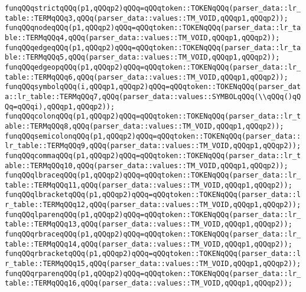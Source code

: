 \verb|funqQQqstrictqQQq(p1,qQQqp2)qQQq=qQQqtoken::TOKENqQQq(parser_data::lr_table::TERMqQQq3,qQQq(parser_data::values::TM_VOID,qQQqp1,qQQqp2));|\newline
\verb|funqQQqnodeqQQq(p1,qQQqp2)qQQq=qQQqtoken::TOKENqQQq(parser_data::lr_table::TERMqQQq4,qQQq(parser_data::values::TM_VOID,qQQqp1,qQQqp2));|\newline
\verb|funqQQqedgeqQQq(p1,qQQqp2)qQQq=qQQqtoken::TOKENqQQq(parser_data::lr_table::TERMqQQq5,qQQq(parser_data::values::TM_VOID,qQQqp1,qQQqp2));|\newline
\verb|funqQQqedgeopqQQq(p1,qQQqp2)qQQq=qQQqtoken::TOKENqQQq(parser_data::lr_table::TERMqQQq6,qQQq(parser_data::values::TM_VOID,qQQqp1,qQQqp2));|\newline
\verb|funqQQqsymbolqQQq(i,qQQqp1,qQQqp2)qQQq=qQQqtoken::TOKENqQQq(parser_data::lr_table::TERMqQQq7,qQQq(parser_data::values::SYMBOLqQQq(\\qQQq()qQQq=qQQqi),qQQqp1,qQQqp2));|\newline
\verb|funqQQqcolonqQQq(p1,qQQqp2)qQQq=qQQqtoken::TOKENqQQq(parser_data::lr_table::TERMqQQq8,qQQq(parser_data::values::TM_VOID,qQQqp1,qQQqp2));|\newline
\verb|funqQQqsemicolonqQQq(p1,qQQqp2)qQQq=qQQqtoken::TOKENqQQq(parser_data::lr_table::TERMqQQq9,qQQq(parser_data::values::TM_VOID,qQQqp1,qQQqp2));|\newline
\verb|funqQQqcommaqQQq(p1,qQQqp2)qQQq=qQQqtoken::TOKENqQQq(parser_data::lr_table::TERMqQQq10,qQQq(parser_data::values::TM_VOID,qQQqp1,qQQqp2));|\newline
\verb|funqQQqlbraceqQQq(p1,qQQqp2)qQQq=qQQqtoken::TOKENqQQq(parser_data::lr_table::TERMqQQq11,qQQq(parser_data::values::TM_VOID,qQQqp1,qQQqp2));|\newline
\verb|funqQQqlbracketqQQq(p1,qQQqp2)qQQq=qQQqtoken::TOKENqQQq(parser_data::lr_table::TERMqQQq12,qQQq(parser_data::values::TM_VOID,qQQqp1,qQQqp2));|\newline
\verb|funqQQqlparenqQQq(p1,qQQqp2)qQQq=qQQqtoken::TOKENqQQq(parser_data::lr_table::TERMqQQq13,qQQq(parser_data::values::TM_VOID,qQQqp1,qQQqp2));|\newline
\verb|funqQQqrbraceqQQq(p1,qQQqp2)qQQq=qQQqtoken::TOKENqQQq(parser_data::lr_table::TERMqQQq14,qQQq(parser_data::values::TM_VOID,qQQqp1,qQQqp2));|\newline
\verb|funqQQqrbracketqQQq(p1,qQQqp2)qQQq=qQQqtoken::TOKENqQQq(parser_data::lr_table::TERMqQQq15,qQQq(parser_data::values::TM_VOID,qQQqp1,qQQqp2));|\newline
\verb|funqQQqrparenqQQq(p1,qQQqp2)qQQq=qQQqtoken::TOKENqQQq(parser_data::lr_table::TERMqQQq16,qQQq(parser_data::values::TM_VOID,qQQqp1,qQQqp2));|\newline
